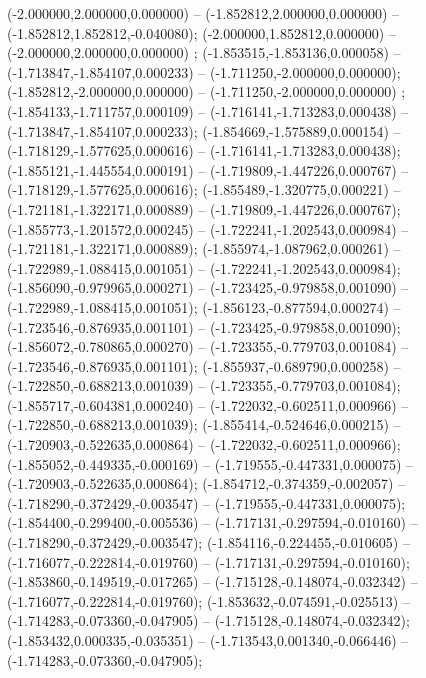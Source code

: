  (-2.000000,2.000000,0.000000) -- (-1.852812,2.000000,0.000000) -- (-1.852812,1.852812,-0.040080);
 (-2.000000,1.852812,0.000000) -- (-2.000000,2.000000,0.000000) ;
 (-1.853515,-1.853136,0.000058) -- (-1.713847,-1.854107,0.000233) -- (-1.711250,-2.000000,0.000000);
 (-1.852812,-2.000000,0.000000) -- (-1.711250,-2.000000,0.000000) ;
 (-1.854133,-1.711757,0.000109) -- (-1.716141,-1.713283,0.000438) -- (-1.713847,-1.854107,0.000233);
 (-1.854669,-1.575889,0.000154) -- (-1.718129,-1.577625,0.000616) -- (-1.716141,-1.713283,0.000438);
 (-1.855121,-1.445554,0.000191) -- (-1.719809,-1.447226,0.000767) -- (-1.718129,-1.577625,0.000616);
 (-1.855489,-1.320775,0.000221) -- (-1.721181,-1.322171,0.000889) -- (-1.719809,-1.447226,0.000767);
 (-1.855773,-1.201572,0.000245) -- (-1.722241,-1.202543,0.000984) -- (-1.721181,-1.322171,0.000889);
 (-1.855974,-1.087962,0.000261) -- (-1.722989,-1.088415,0.001051) -- (-1.722241,-1.202543,0.000984);
 (-1.856090,-0.979965,0.000271) -- (-1.723425,-0.979858,0.001090) -- (-1.722989,-1.088415,0.001051);
 (-1.856123,-0.877594,0.000274) -- (-1.723546,-0.876935,0.001101) -- (-1.723425,-0.979858,0.001090);
 (-1.856072,-0.780865,0.000270) -- (-1.723355,-0.779703,0.001084) -- (-1.723546,-0.876935,0.001101);
 (-1.855937,-0.689790,0.000258) -- (-1.722850,-0.688213,0.001039) -- (-1.723355,-0.779703,0.001084);
 (-1.855717,-0.604381,0.000240) -- (-1.722032,-0.602511,0.000966) -- (-1.722850,-0.688213,0.001039);
 (-1.855414,-0.524646,0.000215) -- (-1.720903,-0.522635,0.000864) -- (-1.722032,-0.602511,0.000966);
 (-1.855052,-0.449335,-0.000169) -- (-1.719555,-0.447331,0.000075) -- (-1.720903,-0.522635,0.000864);
 (-1.854712,-0.374359,-0.002057) -- (-1.718290,-0.372429,-0.003547) -- (-1.719555,-0.447331,0.000075);
 (-1.854400,-0.299400,-0.005536) -- (-1.717131,-0.297594,-0.010160) -- (-1.718290,-0.372429,-0.003547);
 (-1.854116,-0.224455,-0.010605) -- (-1.716077,-0.222814,-0.019760) -- (-1.717131,-0.297594,-0.010160);
 (-1.853860,-0.149519,-0.017265) -- (-1.715128,-0.148074,-0.032342) -- (-1.716077,-0.222814,-0.019760);
 (-1.853632,-0.074591,-0.025513) -- (-1.714283,-0.073360,-0.047905) -- (-1.715128,-0.148074,-0.032342);
 (-1.853432,0.000335,-0.035351) -- (-1.713543,0.001340,-0.066446) -- (-1.714283,-0.073360,-0.047905);
